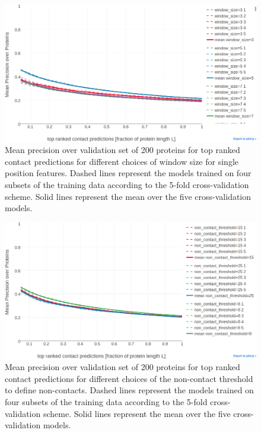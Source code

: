\documentclass[11pt,a4paper,twoside]{book}
\theoremstyle{definition}
\theoremstyle{definition}
\theoremstyle{remark}
\begin{document}
\begin{figure}

{\centering \includegraphics[width=0.9\linewidth]{img/random_forest_contact_prior/cross_validation/precision_vs_rank_cv_on_test_random_forest_nestimators1000_maxfeatureslog2_maxdepth10_minsamplesleaf100_windowsize} 

}

\caption{Mean precision over
validation set of 200 proteins for top ranked contact predictions for
different choices of window size for single position features. Dashed
lines represent the models trained on four subsets of the training data
according to the 5-fold cross-validation scheme. Solid lines represent
the mean over the five cross-validation models.}\label{fig:random-forest-window-size-cv}
\end{figure}








\begin{figure}

{\centering \includegraphics[width=0.9\linewidth]{img/random_forest_contact_prior/cross_validation/precision_vs_rank_cv_on_test_random_forest_nestimators1000_maxfeatureslog2_maxdepth10_minsamplesleaf100_noncontactthr} 

}

\caption{Mean precision over
validation set of 200 proteins for top ranked contact predictions for
different choices of the non-contact threshold to define non-contacts.
Dashed lines represent the models trained on four subsets of the
training data according to the 5-fold cross-validation scheme. Solid
lines represent the mean over the five cross-validation models.}\label{fig:random-forest-noncontactthr-cv}
\end{figure}
\end{document}
